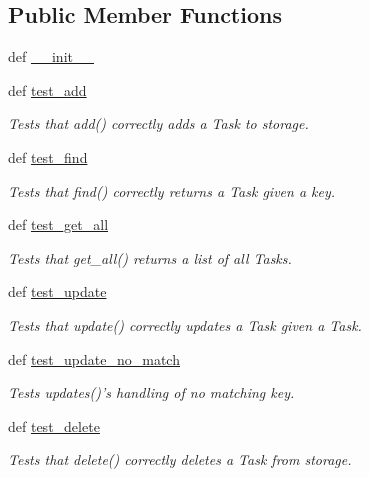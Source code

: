 \subsection*{\-Public \-Member \-Functions}
\begin{DoxyCompactItemize}
\item 
def \hyperlink{classtest__taskstorage_1_1TestStorage_a41a9bc77946b61981cdaebb9cdff74f8}{\-\_\-\-\_\-init\-\_\-\-\_\-}
\item 
def \hyperlink{classtest__taskstorage_1_1TestStorage_aa6ca7dc5de002789d4d4ccdf67fdb08e}{test\-\_\-add}
\begin{DoxyCompactList}\small\item\em \-Tests that add() correctly adds a \-Task to storage. \end{DoxyCompactList}\item 
def \hyperlink{classtest__taskstorage_1_1TestStorage_a356b78c44916f1920e3a22c3dbca378f}{test\-\_\-find}
\begin{DoxyCompactList}\small\item\em \-Tests that find() correctly returns a \-Task given a key. \end{DoxyCompactList}\item 
def \hyperlink{classtest__taskstorage_1_1TestStorage_a09f937b953d03c22d7630817d90b9362}{test\-\_\-get\-\_\-all}
\begin{DoxyCompactList}\small\item\em \-Tests that get\-\_\-all() returns a list of all \-Tasks. \end{DoxyCompactList}\item 
def \hyperlink{classtest__taskstorage_1_1TestStorage_a9c88d63e97ce968fc34e873fa5d559c1}{test\-\_\-update}
\begin{DoxyCompactList}\small\item\em \-Tests that update() correctly updates a \-Task given a \-Task. \end{DoxyCompactList}\item 
def \hyperlink{classtest__taskstorage_1_1TestStorage_a437b4c393131de87ba9c555f92c5cb79}{test\-\_\-update\-\_\-no\-\_\-match}
\begin{DoxyCompactList}\small\item\em \-Tests updates()'s handling of no matching key. \end{DoxyCompactList}\item 
def \hyperlink{classtest__taskstorage_1_1TestStorage_a8b8bb9f5d0f2184902b2ce0dc1fd491d}{test\-\_\-delete}
\begin{DoxyCompactList}\small\item\em \-Tests that delete() correctly deletes a \-Task from storage. \end{DoxyCompactList}\item 

\end{DoxyCompactItemize}
